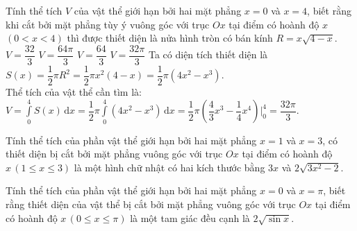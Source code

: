\begin{vd}%
	Tính thể tích $V$ của vật thể giới hạn bởi hai mặt phẳng $x=0$ và $x=4$, biết rằng khi cắt bởi mặt phẳng tùy ý vuông góc với trục $Ox$ tại điểm có hoành độ $x$ $(0<x<4)$ thì được thiết diện là nửa hình tròn có bán kính $R=x\sqrt{4-x}$.
	\choice
	{$V=\dfrac{32}{3}$}
	{$V=\dfrac{64\pi}{3}$}
	{$V=\dfrac{64}{3}$}
	{\True $V=\dfrac{32\pi}{3}$}
	\loigiai
	{Ta có diện tích thiết diện là $S(x)=\dfrac{1}{2}\pi R^2=\dfrac{1}{2}\pi x^2(4-x)=\dfrac{1}{2}\pi \left(4x^2-x^3\right)$.\\
		Thể tích của vật thể cần tìm là: $V=\displaystyle\int\limits_{0}^{4}S(x)\mathrm{\, d}x=\dfrac{1}{2}\pi\displaystyle\int\limits_{0}^{4}\left(4x^2-x^3 \right)\mathrm{\, d}x=\dfrac{1}{2}\pi\left( \dfrac{4}{3}x^3-\dfrac{1}{4}x^4\right)\biggl|_0^4=\dfrac{32\pi}{3}$.
	}
\end{vd}
\begin{vd}
	Tính thể tích của phần vật thể giới hạn bởi hai mặt phẳng $x = 1$ và $x = 3$, có thiết diện bị cắt bởi mặt phẳng vuông góc với trục $Ox$ tại điểm có hoành độ $x\, (1\leq x \leq 3)$ là một hình chữ nhật có hai kích thước bằng $3x$ và $2\sqrt{3x^2-2}$.
\end{vd}

\begin{vd}
	Tính thể tích của phần vật thể giới hạn bởi hai mặt phẳng $x = 0$ và $x =\pi$, biết rằng thiết diện của vật thể bị cắt bởi mặt phẳng vuông góc với trục $Ox$ tại điểm có hoành độ $x\, (0\leq x \leq \pi)$ là một tam giác đều cạnh là $2\sqrt{\sin x}$.%
\end{vd}

